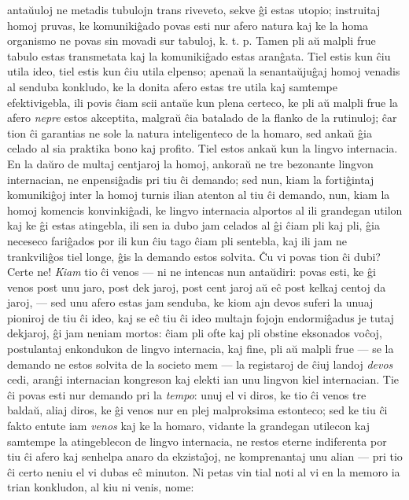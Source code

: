 anta\u uuloj ne metadis tubulojn trans riveveto, sekve \^gi estas
utopio; instruitaj homoj pruvas, ke komuniki\^gado povas esti nur
afero natura kaj ke la homa organismo ne povas sin movadi sur
tabuloj, k. t. p. Tamen pli a\u u malpli frue tabulo estas
transmetata kaj la komuniki\^gado estas aran\^gata. Tiel estis kun
\^ciu utila ideo, tiel estis kun \^ciu utila elpenso; apena\u u la
senanta\u uju\^gaj homoj venadis al senduba konkludo, ke la donita
afero estas tre utila kaj samtempe efektivigebla, ili povis \^ciam
scii anta\u ue kun plena certeco, ke pli a\u u malpli frue la afero
{\sl nepre} estos akceptita, malgra\u u \^cia batalado de la flanko
de la rutinuloj; \^car tion \^ci garantias ne sole la natura
inteligenteco de la homaro, sed anka\u u \^gia celado al sia
praktika bono kaj profito. Tiel estos anka\u u kun la lingvo
internacia. En la da\u uro de multaj centjaroj la homoj, ankora\u u
ne tre bezonante lingvon internacian, ne enpensi\^gadis pri tiu \^ci
demando; sed nun, kiam la forti\^gintaj komuniki\^goj inter la homoj
turnis ilian atenton al tiu \^ci demando, nun, kiam la homoj
komencis konvinki\^gadi, ke lingvo internacia alportos al ili
grandegan utilon kaj ke \^gi estas atingebla, ili sen ia dubo jam
celados al \^gi \^ciam pli kaj pli, \^gia neceseco fari\^gados por
ili kun \^ciu tago \^ciam pli sentebla, kaj ili jam ne
trankvili\^gos tiel longe, \^gis la demando estos solvita. \^Cu vi
povas tion \^ci dubi? Certe ne! {\sl Kiam} tio \^ci venos --- ni ne
intencas nun anta\u udiri: povas esti, ke \^gi venos post unu jaro,
post dek jaroj, post cent jaroj a\u u e\^c post kelkaj centoj da
jaroj, --- sed unu afero estas jam senduba, ke kiom ajn devos suferi
la unuaj pioniroj de tiu \^ci ideo, kaj se e\^c tiu \^ci ideo
multajn fojojn endormi\^gadus je tutaj dekjaroj, \^gi jam neniam
mortos: \^ciam pli ofte kaj pli obstine eksonados vo\^coj,
postulantaj enkondukon de lingvo internacia, kaj fine, pli a\u u
malpli frue --- se la demando ne estos solvita de la societo mem
--- la registaroj de \^ciuj landoj {\sl devos} cedi, aran\^gi internacian
kongreson kaj elekti ian unu lingvon kiel internacian. Tie \^ci
povas esti nur demando pri la {\sl tempo}: unuj el vi diros, ke tio
\^ci venos tre balda\u u, aliaj diros, ke \^gi venos nur en plej
malproksima estonteco; sed ke tiu \^ci fakto entute iam {\sl venos}
kaj ke la homaro, vidante la grandegan utilecon kaj samtempe la
atingeblecon de lingvo internacia, ne restos eterne indiferenta por
tiu \^ci afero kaj senhelpa anaro da ekzista\^{\j}oj, ne
komprenantaj unu alian --- pri tio \^ci certo neniu el vi dubas e\^c
minuton. Ni petas vin tial noti al vi en la memoro ia trian
konkludon, al kiu ni venis, nome:

